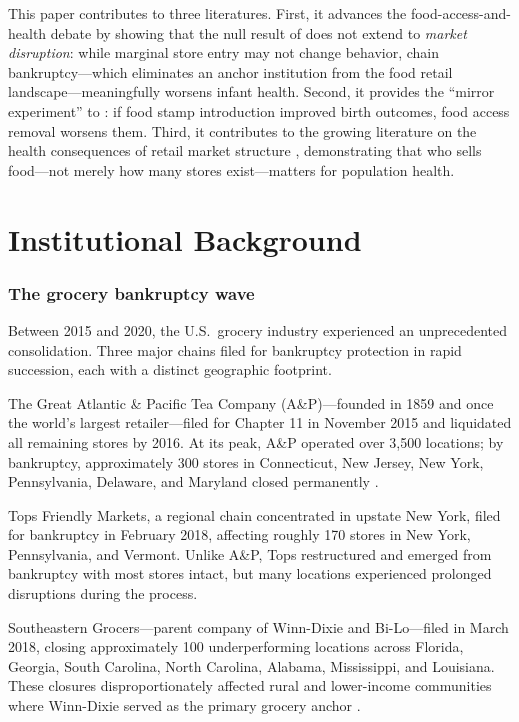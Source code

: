 \documentclass[12pt]{article}
\begin{document}
This paper contributes to three literatures. First, it advances the food-access-and-health debate by showing that the null result of \citet{allcott2019food} does not extend to \textit{market disruption}: while marginal store entry may not change behavior, chain bankruptcy---which eliminates an anchor institution from the food retail landscape---meaningfully worsens infant health. Second, it provides the ``mirror experiment'' to \citet{hoynes2011can}: if food stamp introduction improved birth outcomes, food access removal worsens them. Third, it contributes to the growing literature on the health consequences of retail market structure \citep{currie2010effect, thomadsen2005effect, handbury2015goods, bitler2010wic}, demonstrating that who sells food---not merely how many stores exist---matters for population health.

\section{Institutional Background}

\subsubsection*{The grocery bankruptcy wave} Between 2015 and 2020, the U.S.\ grocery industry experienced an unprecedented consolidation. Three major chains filed for bankruptcy protection in rapid succession, each with a distinct geographic footprint.

The Great Atlantic \& Pacific Tea Company (A\&P)---founded in 1859 and once the world's largest retailer---filed for Chapter 11 in November 2015 and liquidated all remaining stores by 2016. At its peak, A\&P operated over 3,500 locations; by bankruptcy, approximately 300 stores in Connecticut, New Jersey, New York, Pennsylvania, Delaware, and Maryland closed permanently \citep{levinson2011great}.

Tops Friendly Markets, a regional chain concentrated in upstate New York, filed for bankruptcy in February 2018, affecting roughly 170 stores in New York, Pennsylvania, and Vermont. Unlike A\&P, Tops restructured and emerged from bankruptcy with most stores intact, but many locations experienced prolonged disruptions during the process.

Southeastern Grocers---parent company of Winn-Dixie and Bi-Lo---filed in March 2018, closing approximately 100 underperforming locations across Florida, Georgia, South Carolina, North Carolina, Alabama, Mississippi, and Louisiana. These closures disproportionately affected rural and lower-income communities where Winn-Dixie served as the primary grocery anchor \citep{brown2019shopping}.
\end{document}
